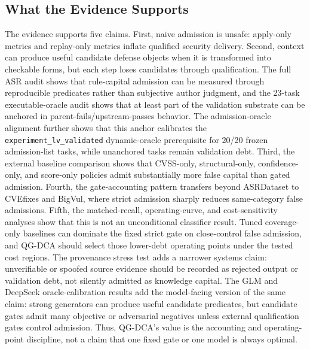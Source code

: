﻿\documentclass[lettersize,journal]{IEEEtran}
\begin{document}
\subsection{What the Evidence Supports}
The evidence supports five claims. First, naive admission is unsafe: apply-only metrics and replay-only metrics inflate qualified security delivery. Second, context can produce useful candidate defense objects when it is transformed into checkable forms, but each step loses candidates through qualification. The full ASR audit shows that rule-capital admission can be measured through reproducible predicates rather than subjective author judgment, and the 23-task executable-oracle audit shows that at least part of the validation substrate can be anchored in parent-fails/upstream-passes behavior. The admission-oracle alignment further shows that this anchor calibrates the \texttt{experiment\_lv\_validated} dynamic-oracle prerequisite for 20/20 frozen admission-list tasks, while unanchored tasks remain validation debt. Third, the external baseline comparison shows that CVSS-only, structural-only, confidence-only, and score-only policies admit substantially more false capital than gated admission. Fourth, the gate-accounting pattern transfers beyond ASRDataset to CVEfixes and BigVul, where strict admission sharply reduces same-category false admissions. Fifth, the matched-recall, operating-curve, and cost-sensitivity analyses show that this is not an unconditional classifier result. Tuned coverage-only baselines can dominate the fixed strict gate on close-control false admission, and QG-DCA should select those lower-debt operating points under the tested cost regions. The provenance stress test adds a narrower systems claim: unverifiable or spoofed source evidence should be recorded as rejected output or validation debt, not silently admitted as knowledge capital. The GLM and DeepSeek oracle-calibration results add the model-facing version of the same claim: strong generators can produce useful candidate predicates, but candidate gates admit many objective or adversarial negatives unless external qualification gates control admission. Thus, QG-DCA's value is the accounting and operating-point discipline, not a claim that one fixed gate or one model is always optimal.
\end{document}
